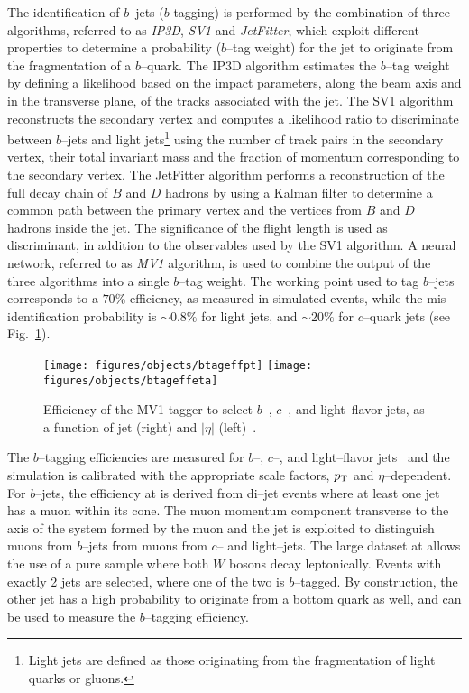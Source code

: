 The identification of $b$--jets ($b$-tagging) is performed by the
combination of three algorithms, referred to as {\it
  IP3D}, {\it SV1} and {\it JetFitter}, which exploit different properties to
determine a probability ($b$--tag weight) for the jet to originate
from the fragmentation of a $b$--quark. 
The IP3D algorithm estimates the $b$--tag weight by defining a
likelihood based on the impact parameters, along the beam axis and in
the transverse plane, of the tracks associated with the jet.
The SV1 algorithm reconstructs the secondary vertex and computes a
likelihood ratio to discriminate between $b$--jets and light
jets\footnote{Light jets are defined as those originating from the fragmentation of light quarks
  or gluons.} using the number of track pairs in the secondary vertex,
their total invariant mass and the fraction of momentum corresponding
to the secondary vertex.
The JetFitter algorithm performs a reconstruction of the full decay
chain of $B$ and $D$ hadrons by using a Kalman filter to determine a
common path between the primary vertex and the vertices from $B$ and
$D$ hadrons inside the jet. The significance of the flight length is
used as discriminant, in addition to the observables used by the
SV1 algorithm.
A neural network, referred to as {\it MV1} algorithm, is used to combine the
output of the three algorithms into a single $b$--tag weight.
The working point used to tag $b$--jets corresponds to a $70\%$
efficiency, as measured in \ttbar{} simulated events, while the
mis--identification probability is $\sim0.8\%$ for light jets, and
$\sim20\%$ for $c$--quark jets (see Fig.~\ref{fig:btag}). 

\begin{figure}[htb!]\centering
  \texttt{[image: figures/objects/btageffpt]}
  \texttt{[image: figures/objects/btageffeta]}
  \caption{Efficiency of the MV1 tagger to select $b$--, $c$--, and
    light--flavor jets, as a function of jet \pt{} (right) and
    $|\eta|$ (left)~\cite{ATLAS-CONF-2014-046}.} 
  \label{fig:btag}
\end{figure}

The $b$--tagging efficiencies are measured for 
$b$--, $c$--, and light--flavor jets~\cite{btagging,ctagging,ltagging}
and the simulation is calibrated with the appropriate scale factors,
$p_{\mathrm{T}}$ and $\eta$--dependent.
For $b$--jets, the efficiency at \seventev{} is
derived from di--jet events where at least one jet has a muon within
its cone. 
The muon momentum component transverse to
the axis of the system formed by the muon and the jet is exploited
to distinguish muons from $b$--jets from muons from $c$-- and
light--jets. 
The large dataset at \eighttev{} allows the use of a pure
\ttbar{} sample where both $W$ bosons decay leptonically. Events with exactly
2 jets are selected, where one of the two is $b$--tagged. By
construction, the other jet has a high probability to originate from a
bottom quark as well, and can be used to measure the $b$--tagging efficiency.

